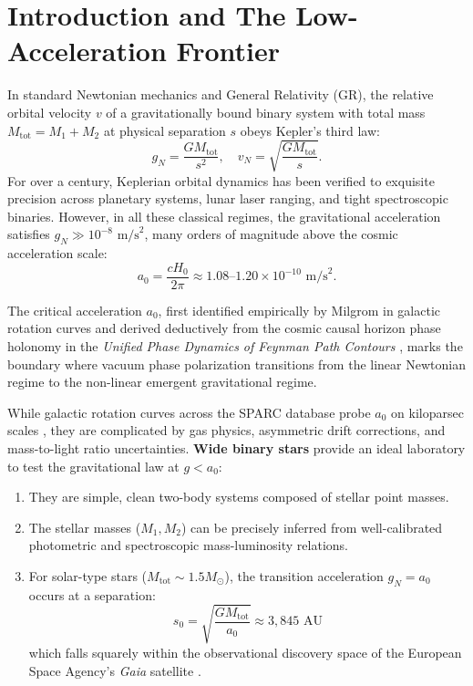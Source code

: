 \documentclass[11pt,a4paper]{article}
\begin{document}
\section{Introduction and The Low-Acceleration Frontier}
In standard Newtonian mechanics and General Relativity (GR), the relative orbital velocity $v$ of a gravitationally bound binary system with total mass $M_{\mathrm{tot}} = M_1 + M_2$ at physical separation $s$ obeys Kepler's third law:
\begin{equation}
g_N = \frac{G M_{\mathrm{tot}}}{s^2}, \quad v_N = \sqrt{\frac{G M_{\mathrm{tot}}}{s}}.
\end{equation}
For over a century, Keplerian orbital dynamics has been verified to exquisite precision across planetary systems, lunar laser ranging, and tight spectroscopic binaries. However, in all these classical regimes, the gravitational acceleration satisfies $g_N \gg 10^{-8}\text{ m/s}^2$, many orders of magnitude above the cosmic acceleration scale:
\begin{equation}
a_0 = \frac{c H_0}{2\pi} \approx 1.08\text{--}1.20 \times 10^{-10}\text{ m/s}^2.
\end{equation}

The critical acceleration $a_0$, first identified empirically by Milgrom \cite{milgrom1983} in galactic rotation curves and derived deductively from the cosmic causal horizon phase holonomy in the \textit{Unified Phase Dynamics of Feynman Path Contours} \cite{pavliuk2024monograph}, marks the boundary where vacuum phase polarization transitions from the linear Newtonian regime to the non-linear emergent gravitational regime.

While galactic rotation curves across the SPARC database probe $a_0$ on kiloparsec scales \cite{lelli2016}, they are complicated by gas physics, asymmetric drift corrections, and mass-to-light ratio uncertainties. \textbf{Wide binary stars} provide an ideal laboratory to test the gravitational law at $g < a_0$:
\begin{enumerate}
    \item They are simple, clean two-body systems composed of stellar point masses.
    \item The stellar masses ($M_1, M_2$) can be precisely inferred from well-calibrated photometric and spectroscopic mass-luminosity relations.
    \item For solar-type stars ($M_{\mathrm{tot}} \sim 1.5 M_\odot$), the transition acceleration $g_N = a_0$ occurs at a separation:
    \begin{equation}
    s_0 = \sqrt{\frac{G M_{\mathrm{tot}}}{a_0}} \approx 3,845\text{ AU}
    \end{equation}
    which falls squarely within the observational discovery space of the European Space Agency's \textit{Gaia} satellite \cite{gaia2023}.
\end{enumerate}
\end{document}
